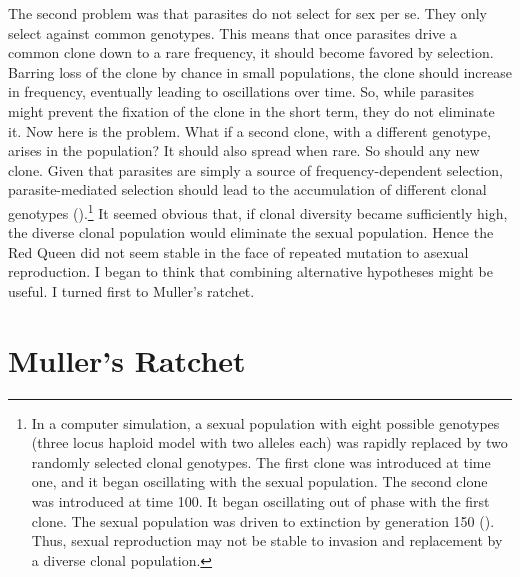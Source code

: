 \documentclass[
  letterpaper,
]{book}
\begin{document}
The second problem was that parasites do not select for sex per se. They
only select against common genotypes. This means that once parasites
drive a common clone down to a rare frequency, it should become favored
by selection. Barring loss of the clone by chance in small populations,
the clone should increase in frequency, eventually leading to
oscillations over time. So, while parasites might prevent the fixation
of the clone in the short term, they do not eliminate it. Now here is
the problem. What if a second clone, with a different genotype, arises
in the population? It should also spread when rare. So should any new
clone. Given that parasites are simply a source of frequency-dependent
selection, parasite-mediated selection should lead to the accumulation
of different clonal genotypes ().\footnote{In a computer simulation, a sexual population
  with eight possible genotypes (three locus haploid model with two
  alleles each) was rapidly replaced by two randomly selected clonal
  genotypes. The first clone was introduced at time one, and it began
  oscillating with the sexual population. The second clone was
  introduced at time 100. It began oscillating out of phase with the
  first clone. The sexual population was driven to extinction by
  generation 150 ().
  Thus, sexual reproduction may not be stable to invasion and
  replacement by a diverse clonal population.} It seemed obvious that,
if clonal diversity became sufficiently high, the diverse clonal
population would eliminate the sexual population. Hence the Red Queen
did not seem stable in the face of repeated mutation to asexual
reproduction. I began to think that combining alternative hypotheses
might be useful. I turned first to Muller's ratchet.

\section{Muller's Ratchet}\label{mullers-ratchet}
\end{document}
